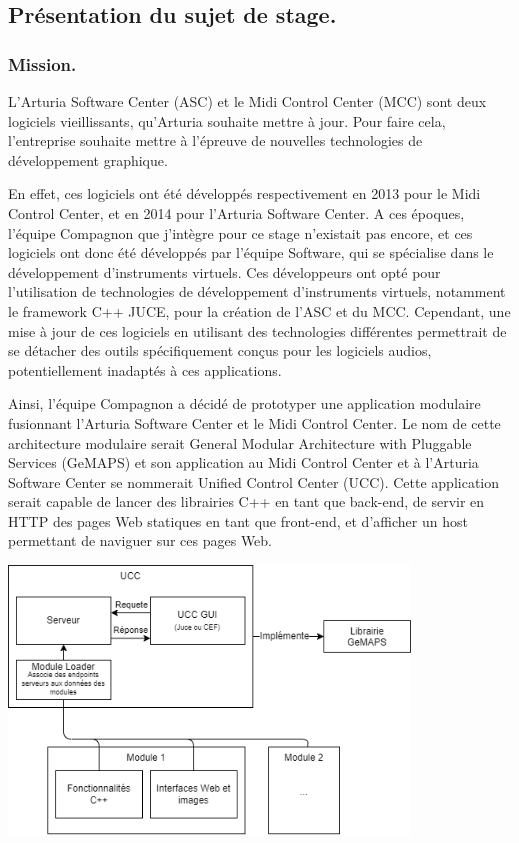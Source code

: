 \documentclass[francais]{rapportPFE}  %
\begin{document}
\subsection{Présentation du sujet de stage.}


\subsubsection{Mission.}

L'Arturia Software Center (ASC) et le Midi Control Center (MCC) sont deux logiciels vieillissants, qu'Arturia souhaite mettre à jour. Pour faire cela, l'entreprise souhaite mettre à l'épreuve de nouvelles technologies de développement graphique.

En effet, ces logiciels ont été développés respectivement en 2013 pour le Midi Control Center, et en 2014 pour l'Arturia Software Center. A ces époques, l'équipe Compagnon que j'intègre pour ce stage n'existait pas encore, et ces logiciels ont donc été développés par l'équipe Software, qui se spécialise dans le développement d'instruments virtuels. Ces développeurs ont opté pour l'utilisation de technologies de développement d'instruments virtuels, notamment le framework C++ JUCE, pour la création de l'ASC et du MCC. Cependant, une mise à jour de ces logiciels en utilisant des technologies différentes permettrait de se détacher des outils spécifiquement conçus pour les logiciels audios, potentiellement inadaptés à ces applications.

Ainsi, l'équipe Compagnon a décidé de prototyper une application modulaire fusionnant l'Arturia Software Center et le Midi Control Center. Le nom de cette architecture modulaire serait General Modular Architecture with Pluggable Services (GeMAPS) et son application au Midi Control Center et à l'Arturia Software Center se nommerait Unified Control Center (UCC). Cette application serait capable de lancer des librairies C++ en tant que back-end, de servir en HTTP des pages Web statiques en tant que front-end, et d'afficher un host permettant de naviguer sur ces pages Web. 

 
\begin{center}
	\centering
	\includegraphics[width=0.8\textwidth]{graphics/modulaire.png}
	\begin{tiny}
	\end{tiny}
	\label{fig}
\end{center}
\end{document}
